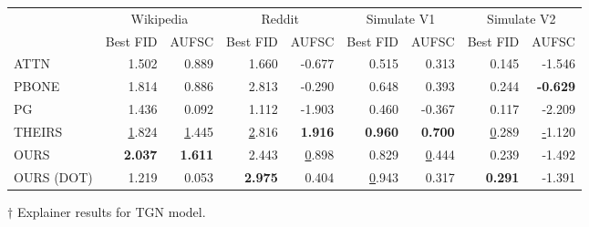 \begin{tabular}{lrrrrrrrr}
\toprule
 & \multicolumn{2}{c}{Wikipedia} & \multicolumn{2}{c}{Reddit} & \multicolumn{2}{c}{Simulate V1} & \multicolumn{2}{c}{Simulate V2} \\
 & Best FID & AUFSC & Best FID & AUFSC & Best FID & AUFSC & Best FID & AUFSC \\
\midrule
ATTN & 1.502 & 0.889 & 1.660 & -0.677 & 0.515 & 0.313 & 0.145 & -1.546 \\
PBONE & 1.814 & 0.886 & 2.813 & -0.290 & 0.648 & 0.393 & 0.244 & \bfseries -0.629 \\
PG & 1.436 & 0.092 & 1.112 & -1.903 & 0.460 & -0.367 & 0.117 & -2.209 \\
THEIRS & \underline 1.824 & \underline 1.445 & \underline 2.816 & \bfseries 1.916 & \bfseries 0.960 & \bfseries 0.700 & \underline 0.289 & \underline -1.120 \\
OURS & \bfseries 2.037 & \bfseries 1.611 & 2.443 & \underline 0.898 & 0.829 & \underline 0.444 & 0.239 & -1.492 \\
OURS (DOT) & 1.219 & 0.053 & \bfseries 2.975 & 0.404 & \underline 0.943 & 0.317 & \bfseries 0.291 & -1.391 \\
\bottomrule
\end{tabular}
\caption{\label{tab:tgn_results}$\dagger$ Explainer results for TGN model.}
